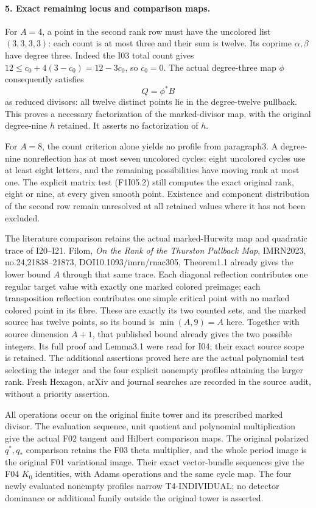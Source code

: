\paragraph{5. Exact remaining locus and comparison maps.}
For $A=4$, a point in the second rank row must have the
uncolored list $(3,3,3,3)$: each count is at most three
and their sum is twelve. Its coprime $\alpha,\beta$ have
degree three. Indeed the I03 total count gives
$12\le c_0+4(3-c_0)=12-3c_0$, so $c_0=0$.
The actual degree-three map $\phi$ consequently satisfies
\[
                  Q=\phi^*B
\]
as reduced divisors: all twelve distinct points lie in
the degree-twelve pullback. This proves a necessary
factorization of the marked-divisor map, with the original
degree-nine $h$ retained. It asserts no factorization of $h$.

For $A=8$, the count criterion alone yields no profile
from paragraph3. A degree-nine nonreflection has at most
seven uncolored cycles: eight uncolored cycles use at least
eight letters, and the remaining possibilities have moving
rank at most one. The explicit matrix test (F1I05.2) still
computes the exact original rank, eight or nine, at every
given smooth point. Existence and component distribution
of the second row remain unresolved at all retained values
where it has not been excluded.

The literature comparison retains the actual marked-Hurwitz
map and quadratic trace of I20--I21. Filom,
\emph{On the Rank of the Thurston Pullback Map}, IMRN2023,
no.24,21838--21873, DOI10.1093/imrn/rnac305,
Theorem1.1 already gives the lower bound $A$ through that
same trace. Each diagonal reflection contributes one regular
target value with exactly one marked colored preimage; each
transposition reflection contributes one simple critical
point with no marked colored point in its fibre. These are
exactly its two counted sets, and the marked source has
twelve points, so its bound is $\min(A,9)=A$ here.
Together with source dimension $A+1$, that published bound
already gives the two possible integers. Its full proof and
Lemma3.1 were read for I04; their exact source scope is
retained. The additional assertions proved here are the
actual polynomial test selecting the integer and the four
explicit nonempty profiles attaining the larger rank.
Fresh Hexagon, arXiv and journal searches are recorded in
the source audit, without a priority assertion.

All operations occur on the original finite tower and
its prescribed marked divisor. The evaluation sequence,
unit quotient and polynomial multiplication give the actual
F02 tangent and Hilbert comparison maps. The original
polarized $q^*,q_*$ comparison retains the F03 theta
multiplier, and the whole period image is the original
F01 variational image. Their exact vector-bundle sequences
give the F04 $K_0$ identities, with Adams operations and
the same cycle map. The four newly evaluated nonempty
profiles narrow T4-INDIVIDUAL; no detector dominance or
additional family outside the original tower is asserted.
